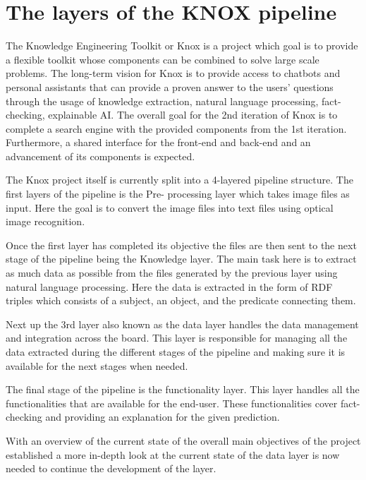 \section{The layers of the KNOX pipeline}
The Knowledge Engineering Toolkit or Knox is a project which goal is to provide a flexible toolkit whose components can be combined 
to solve large scale problems. The long-term vision for Knox is to provide access to chatbots and personal assistants that can  
provide a proven answer to the users' questions through the usage of knowledge extraction, natural language processing, fact- 
checking, explainable AI.
The overall goal for the 2nd iteration of Knox is to complete a search engine with the provided components from the 1st iteration. 
Furthermore, a shared interface for the front-end and back-end and an advancement of its components is expected. 


The Knox project itself is currently split into a 4-layered pipeline structure. The first layers of the pipeline is the Pre-
processing layer which takes image files as input. Here the goal is to convert the image files into text files using optical image 
recognition. 


Once the first layer has completed its objective the files are then sent to the next stage of the pipeline being the Knowledge 
layer. The main task here is to extract as much data as possible from the files generated by the previous layer using natural 
language processing. Here the data is extracted in the form of RDF triples which consists of a subject, an object, and the predicate 
connecting them. 


Next up the 3rd layer also known as the data layer handles the data management and integration across the board. This layer is 
responsible for managing all the data extracted during the different stages of the pipeline and making sure it is available for the 
next stages when needed. 


The final stage of the pipeline is the functionality layer. This layer handles all the functionalities that are available for the 
end-user. These functionalities cover fact-checking and providing an explanation for the given prediction.


With an overview of the current state of the overall main objectives of the project  established a more in-depth look at the current 
state of the data layer is now needed to continue the development of the layer. 

